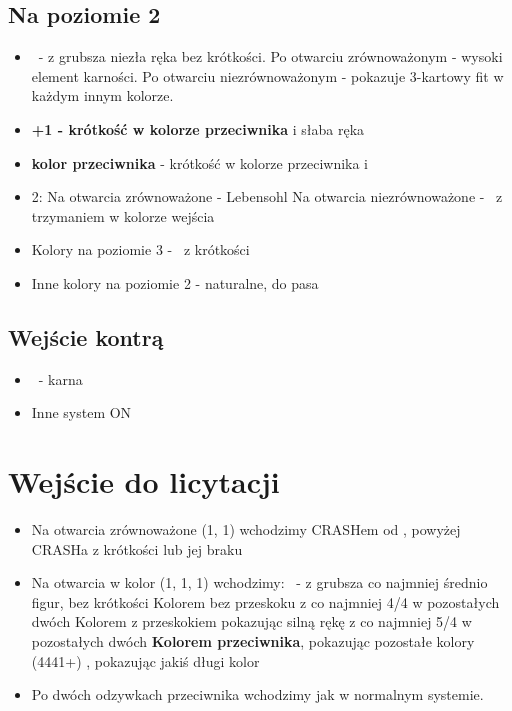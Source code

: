 \documentclass[12pt, a4paper]{article}
\begin{document}
\subsection{Na poziomie 2}
\begin{itemize}
    \item \dbl\ - z grubsza niezła ręka bez krótkości.
    \subitem Po otwarciu zrównoważonym - wysoki element karności.
    \subitem Po otwarciu niezrównoważonym - pokazuje 3-kartowy fit w każdym innym kolorze.
    \item \textbf{+1 - krótkość w kolorze przeciwnika} i słaba ręka
    \item \textbf{kolor przeciwnika} - krótkość w kolorze przeciwnika i \gf
    \item 2\nt:
    \subitem Na otwarcia zrównoważone - Lebensohl
    \subitem Na otwarcia niezrównoważone - \gf\ z trzymaniem w kolorze wejścia
    \item Kolory na poziomie 3 - \gf\ z krótkości
    \item Inne kolory na poziomie 2 - naturalne, do pasa
\end{itemize}

\subsection{Wejście kontrą}
\begin{itemize}
    \item \rdbl\ - karna
    \item Inne system ON
\end{itemize}


\pagebreak
\section{Wejście do licytacji}
\begin{itemize}
    \item Na otwarcia zrównoważone (1\clubs, 1\nt) wchodzimy CRASHem od \dbl, powyżej CRASHa z krótkości lub jej braku
    \item Na otwarcia w kolor (1\diams, 1\hearts, 1\spades) wchodzimy:
    \subitem \dbl\ - z grubsza co najmniej średnio figur, bez krótkości
    \subitem Kolorem bez przeskoku z co najmniej 4/4 w pozostałych dwóch
    \subitem Kolorem z przeskokiem pokazując silną rękę z co najmniej 5/4 w pozostałych dwóch
    \subitem \textbf{Kolorem przeciwnika}, pokazując pozostałe kolory (4441+)
    \nt, pokazując jakiś długi kolor 
    \item Po dwóch odzywkach przeciwnika wchodzimy jak w normalnym systemie.
\end{itemize}
\end{document}

